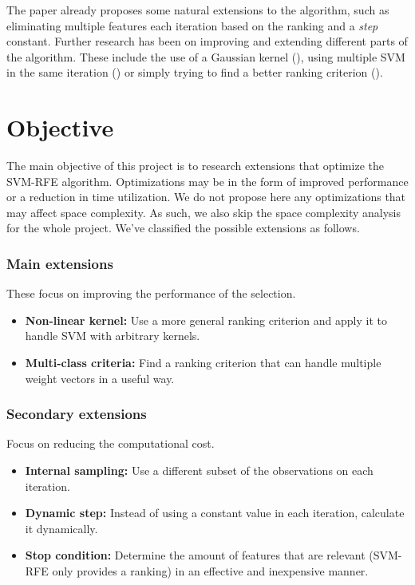The paper already proposes some natural extensions to the al\-go\-rithm, such as eliminating multiple features each iteration based on the ranking and a \emph{step} constant. Further research has been on improving and extending different parts of the al\-go\-rithm. These include the use of a Gaussian kernel (\cite{xue_nonlinear_2018}), using multiple SVM in the same iteration (\cite{wang_classification_2011}) or simply trying to find a better ranking criterion (\cite{mundra_svm-rfe_2007}).


\section{Objective}
\label{sec:ch1.objective}

The main objective of this project is to research extensions that optimize the SVM-RFE algorithm. Optimizations may be in the form of improved performance or a reduction in time utilization. We do not propose here any optimizations that may affect space complexity. As such, we also skip the space complexity analysis for the whole project. We've classified the possible extensions as follows.

\subsubsection*{Main extensions}

These focus on improving the performance of the selection.

\begin{itemize}
    \item \textbf{Non-linear kernel:} Use a more general ranking criterion and apply it to handle SVM with arbitrary kernels.
    \item \textbf{Multi-class criteria:} Find a ranking criterion that can handle multiple weight vectors in a useful way.
\end{itemize}

\subsubsection*{Secondary extensions}

Focus on reducing the computational cost.

\begin{itemize}
    \item \textbf{Internal sampling:} Use a different subset of the observations on each iteration.
    \item \textbf{Dynamic step:} Instead of using a constant value in each iteration, calculate it dynamically.
    \item \textbf{Stop condition:} Determine the amount of features that are relevant (SVM-RFE only provides a ranking) in an effective and inexpensive manner.
\end{itemize}

